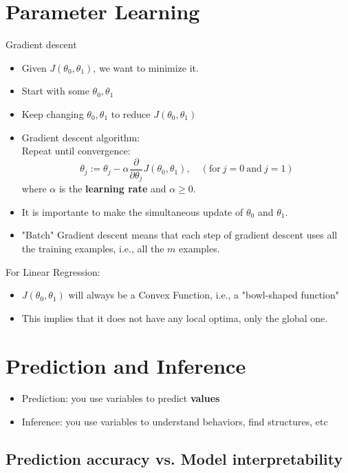\documentclass[a4paper,11pt]{article}
\begin{document}
  \section{Parameter Learning}
  Gradient descent
  \begin{itemize}
    \item Given $J(\theta_0, \theta_1)$, we want to minimize it.
    \item Start with some $\theta_0, \theta_1$
    \item Keep changing $\theta_0, \theta_1$ to reduce $J(\theta_0, \theta_1)$
    \item Gradient descent algorithm: \\
    Repeat until convergence:
    \begin{equation}
      \theta_j := \theta_j - \alpha \frac{\partial}{\partial \theta_j}
      J(\theta_0, \theta_1), \quad (\text{for} \ j=0 \ \text{and} \ j=1)
      \label{eq:gradient_descent}
    \end{equation}
    where $\alpha$ is the \textbf{learning rate} and $\alpha \geqslant   0$.
    \item It is importante to make the simultaneous update of $\theta_0$ and $\theta_1$.
    \item "Batch" Gradient descent means that each step of gradient descent uses all the training examples, i.e., all the $m$ examples.
  \end{itemize}
  For Linear Regression:
  \begin{itemize}
    \item $J(\theta_0, \theta_1)$ will always be a Convex Function, i.e., a "bowl-shaped function"
    \item This implies that it does not have any local optima, only the global one.
  \end{itemize}

  \section{Prediction and Inference}

  \begin{itemize}
    \item Prediction: you use variables to predict \textbf{values}
    \item Inference: you use variables to understand behaviors, find structures, etc
  \end{itemize}

  \subsection*{Prediction accuracy vs. Model interpretability}
\end{document}
